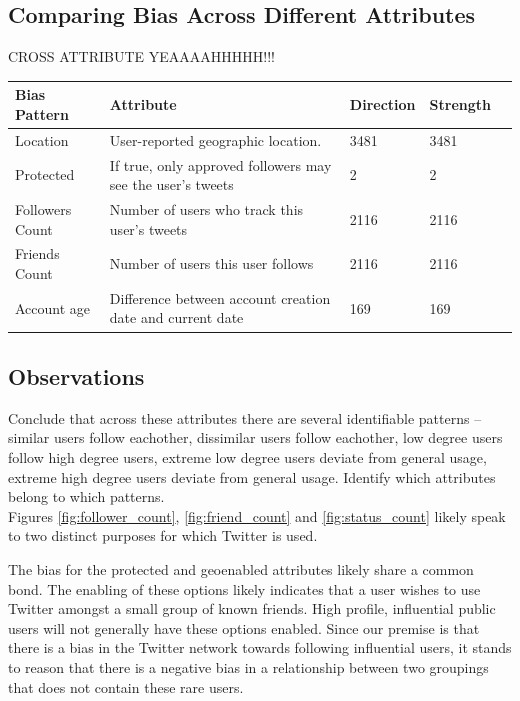 \subsection{Comparing Bias Across Different Attributes}
\label{sub:crossattribute}
CROSS ATTRIBUTE YEAAAAHHHHH!!!

\noindent \begin{tabular}[t]{| p{1in} | p{1.75in} | p{1in} | p{1in} | p{1.25in} |}
\hline
\textbf{Bias Pattern} & \textbf{Attribute} & \textbf{Direction} & \textbf{Strength}  \\ \hline
Location & User-reported geographic location. & 3481 & 3481  \\ \hline
Protected & If true, only approved followers may see the user's tweets & 2 & 2  \\ \hline
Followers Count & Number of users who track this user's tweets & 2116 & 2116 \\ \hline
Friends Count & Number of users this user follows & 2116 & 2116 \\ \hline
Account age & Difference between account creation date and current date & 169 & 169  \\ \hline
\end{tabular}


\subsection{Observations}
Conclude that across these attributes there are several identifiable patterns -- similar users follow eachother, dissimilar users follow eachother, low degree users follow high degree users, extreme low degree users deviate from general usage, extreme high degree users deviate from general usage.  Identify which attributes belong to which patterns.\\

Figures \ref{fig:follower_count}, \ref{fig:friend_count} and \ref{fig:status_count} likely speak to two distinct purposes for which Twitter is used.

The bias for the protected and geoenabled attributes likely share a common bond.  The enabling of these options likely indicates that a user wishes to use Twitter amongst a small group of known friends.  High profile, influential public users will not generally have these options enabled.  Since our premise is that there is a bias in the Twitter network towards following influential users, it stands to reason that there is a negative bias in a relationship between two groupings that does not contain these rare users.
